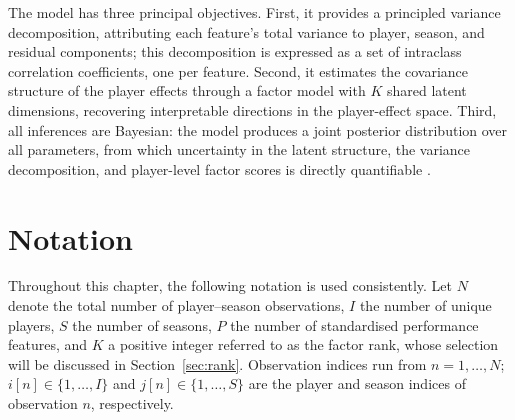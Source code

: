 The model has three principal objectives. First, it provides a principled variance decomposition, attributing each feature's total variance to player, season, and residual components; this decomposition is expressed as a set of intraclass correlation coefficients, one per feature. Second, it estimates the covariance structure of the player effects through a factor model with $K$ shared latent dimensions, recovering interpretable directions in the player-effect space. Third, all inferences are Bayesian: the model produces a joint posterior distribution over all parameters, from which uncertainty in the latent structure, the variance decomposition, and player-level factor scores is directly quantifiable \cite{carpenter2017stan}.

\section{Notation}

Throughout this chapter, the following notation is used consistently. Let $N$ denote the total number of player--season observations, $I$ the number of unique players, $S$ the number of seasons, $P$ the number of standardised performance features, and $K$ a positive integer referred to as the factor rank, whose selection will be discussed in Section~\ref{sec:rank}. Observation indices run from $n = 1, \ldots, N$; $i[n] \in \{1, \ldots, I\}$ and $j[n] \in \{1, \ldots, S\}$ are the player and season indices of observation $n$, respectively.

